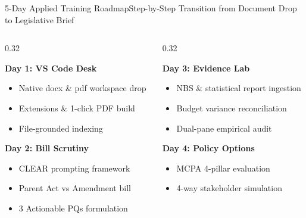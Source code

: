 \documentclass[aspectratio=169, 10pt]{beamer}
\begin{document}
\begin{frame}{5-Day Applied Training Roadmap}{Step-by-Step Transition from Document Drop to Legislative Brief}
  \begin{columns}[t]
    \begin{column}{0.32\textwidth}
      \begin{tcolorbox}[colback=lightgrey, colframe=tanzaniablue, arc=1.2mm, boxrule=0.7pt, title=\textbf{Days 1 \& 2: Foundations}]
        \scriptsize
        \textbf{\textcolor{tanzaniablue}{Day 1: VS Code Desk}}
        \begin{itemize}
          \item Native docx \& pdf workspace drop
          \item Extensions \& 1-click PDF build
          \item File-grounded indexing
        \end{itemize}
        \vspace{2pt}
        \textbf{\textcolor{suagreen}{Day 2: Bill Scrutiny}}
        \begin{itemize}
          \item CLEAR prompting framework
          \item Parent Act vs Amendment bill
          \item 3 Actionable PQs formulation
        \end{itemize}
      \end{tcolorbox}
    \end{column}
    \begin{column}{0.32\textwidth}
      \begin{tcolorbox}[colback=lightgrey, colframe=suagreen, arc=1.2mm, boxrule=0.7pt, title=\textbf{Days 3 \& 4: Empirical \& Policy}]
        \scriptsize
        \textbf{\textcolor{suagreen}{Day 3: Evidence Lab}}
        \begin{itemize}
          \item NBS \& statistical report ingestion
          \item Budget variance reconciliation
          \item Dual-pane empirical audit
        \end{itemize}
        \vspace{2pt}
        \textbf{\textcolor{tanzaniablue}{Day 4: Policy Options}}
        \begin{itemize}
          \item MCPA 4-pillar evaluation
          \item 4-way stakeholder simulation

\end{itemize}
\end{tcolorbox}
\end{column}
\end{columns}
\end{frame}
\end{document}
